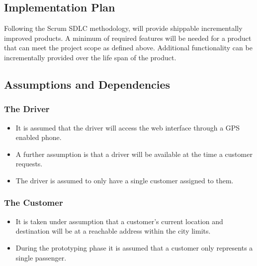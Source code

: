 \documentclass[10pt,twocolumn]{witseiepaper}
\begin{document}
\subsection{Implementation Plan}

Following the Scrum SDLC methodology, will provide shippable incrementally improved products. A minimum of required features will be needed for a product that can meet the project scope as defined above. Additional functionality can be incrementally provided over the life span of the product.

\subsection{Assumptions and Dependencies}

\subsubsection{The Driver}
\begin{itemize}
\item It is assumed that the driver will access the web interface through a GPS enabled phone.
\item A further assumption is that a driver will be available at the time a customer requests. 
\item The driver is assumed to only have a single customer assigned to them.
\end{itemize}

\subsubsection{The Customer}
\begin{itemize}
\item It is taken under assumption that a customer's current location and destination will be at a reachable address within the city limits.
\item During the prototyping phase it is assumed that a customer only represents a single passenger.
\end{itemize}



%



\end{document}
